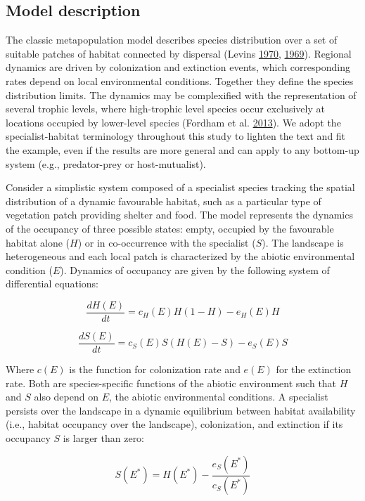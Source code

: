 \documentclass[12pt]{article}
\begin{document}
\hypertarget{model-description}{%
\subsection{Model description}\label{model-description}}

The classic metapopulation model describes species distribution over a
set of suitable patches of habitat connected by dispersal (Levins
\protect\hyperlink{ref-levins_mathematical_1970}{1970},
\protect\hyperlink{ref-levins_demographic_1969}{1969}). Regional
dynamics are driven by colonization and extinction events, which
corresponding rates depend on local environmental conditions. Together
they define the species distribution limits. The dynamics may be
complexified with the representation of several trophic levels, where
high-trophic level species occur exclusively at locations occupied by
lower-level species (Fordham et al.
\protect\hyperlink{ref-fordham_adapted_2013}{2013}). We adopt the
specialist-habitat terminology throughout this study to lighten the text
and fit the example, even if the results are more general and can apply
to any bottom-up system (e.g., predator-prey or host-mutualist).

Consider a simplistic system composed of a specialist species tracking
the spatial distribution of a dynamic favourable habitat, such as a
particular type of vegetation patch providing shelter and food. The
model represents the dynamics of the occupancy of three possible states:
empty, occupied by the favourable habitat alone (\(H\)) or in
co-occurrence with the specialist (\(S\)). The landscape is
heterogeneous and each local patch is characterized by the abiotic
environmental condition (\(E\)). Dynamics of occupancy are given by the
following system of differential equations:

\[
\frac{dH(E)}{dt} = c_{H}(E)H(1-H) - e_{H}(E)H
\]

\[
\frac{dS(E)}{dt} = c_{S}(E)S(H(E)-S) - e_{S}(E)S
\]

Where \(c(E)\) is the function for colonization rate and \(e(E)\) for
the extinction rate. Both are species-specific functions of the abiotic
environment such that \(H\) and \(S\) also depend on \(E\), the abiotic
environmental conditions. A specialist persists over the landscape in a
dynamic equilibrium between habitat availability (i.e., habitat
occupancy over the landscape), colonization, and extinction if its
occupancy \(S\) is larger than zero:

\[
S(E^{*}) = H(E^{*}) - \frac{e_{S}(E^{*})}{c_{S}(E^{*})}
\]
\end{document}
